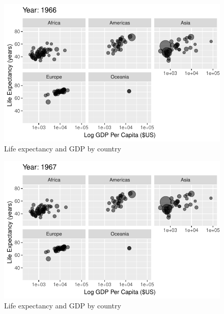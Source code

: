 \documentclass[
  letterpaper,
  DIV=11,
  numbers=noendperiod]{scrreport}
\theoremstyle{definition}
\theoremstyle{remark}
\begin{document}
\begin{figure}

{\centering \includegraphics{index_files/figure-pdf/fig-anim-lifegdp-27.pdf}

}

\caption{\label{fig-anim-lifegdp-27}Life expectancy and GDP by country}

\end{figure}

\begin{figure}

{\centering \includegraphics{index_files/figure-pdf/fig-anim-lifegdp-28.pdf}

}

\caption{\label{fig-anim-lifegdp-28}Life expectancy and GDP by country}

\end{figure}
\end{document}
